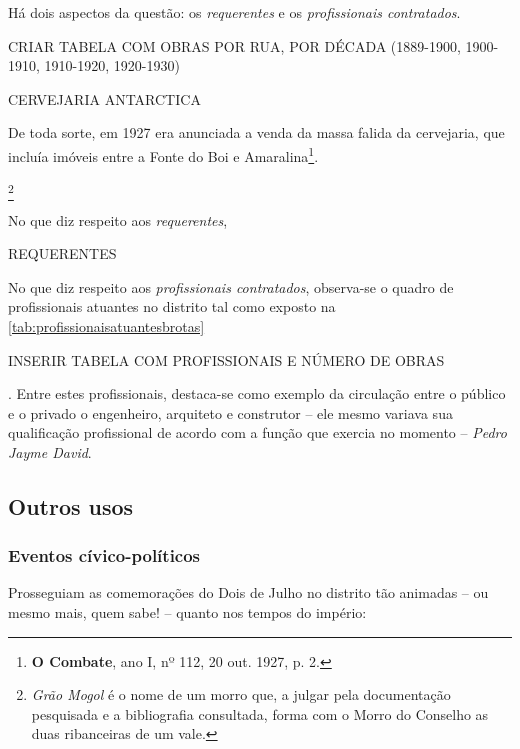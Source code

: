 Há dois aspectos da questão: os \textit{requerentes} e os \textit{profissionais contratados}.

CRIAR TABELA COM OBRAS POR RUA, POR DÉCADA (1889-1900, 1900-1910, 1910-1920, 1920-1930)


CERVEJARIA ANTARCTICA

De toda sorte, em 1927 era anunciada a venda da massa falida da cervejaria, que incluía imóveis entre a Fonte do Boi e Amaralina\footnote{\textbf{O Combate}, ano I, nº 112, 20 out. 1927, p. 2.}.

\footnote{\textit{Grão Mogol} é o nome de um morro que, a julgar pela documentação pesquisada e a bibliografia consultada, forma com o Morro do Conselho as duas ribanceiras de um vale.}


No que diz respeito aos \textit{requerentes},

REQUERENTES

No que diz respeito aos \textit{profissionais contratados}, observa-se o quadro de profissionais atuantes no distrito tal como exposto na \autoref{tab:profissionaisatuantesbrotas}

INSERIR TABELA COM PROFISSIONAIS E NÚMERO DE OBRAS

 . Entre estes profissionais, destaca-se como exemplo da circulação entre o público e o privado o engenheiro, arquiteto e construtor -- ele mesmo variava sua qualificação profissional de acordo com a função que exercia no momento -- \textit{Pedro Jayme David}. 



\subsection{Outros usos}

\subsubsection{Eventos cívico-políticos}

Prosseguiam as comemorações do Dois de Julho no distrito tão animadas -- ou mesmo mais, quem sabe! -- quanto nos tempos do império:

